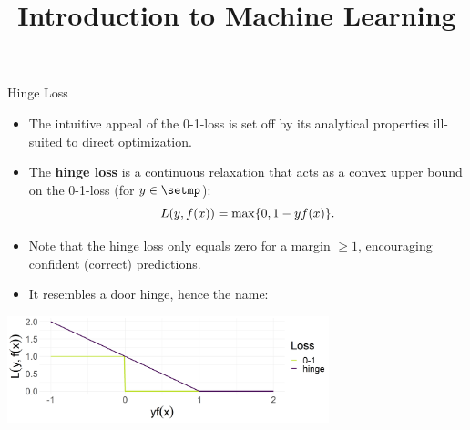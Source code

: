 






\newcommand{\titlefigure}{figure/plot_loss_overview_classif.png}
\newcommand{\learninggoals}{
  \item Know the (squared) hinge loss
  \item Know the $L2$ loss defined on scores
  \item Know the exponential loss
  \item Know the AUC loss 
}

\title{Introduction to Machine Learning}
\date{}





\begin{vbframe}{Hinge Loss}

\begin{itemize}
  \item The intuitive appeal of the 0-1-loss is set off by its analytical
  properties ill-suited to direct optimization.
  \item The \textbf{hinge loss} is a continuous relaxation that acts as a convex 
  upper bound on the 0-1-loss (for $y \in \setmp$): 
  $$L(y, f(x)) = \max \{ 0, 1 - yf(x) \}.$$
  \item Note that the hinge loss only equals zero for a margin $\geq 1$, 
  encouraging confident (correct) predictions.
  \item It resembles a door hinge, hence the name:
\end{itemize}

\begin{center}
\includegraphics[width = 0.7\textwidth]{figure/plot_loss_hinge.png}
\end{center}

\end{vbframe}


